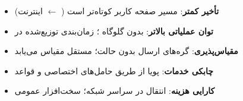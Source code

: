
\begin{itemize}
\tightlist
\item
  \textbf{تأخیر کمتر}: مسیر صفحه کاربر کوتاه‌تر است ( \ensuremath{\leftarrow} اینترنت)
\item
  \textbf{توان عملیاتی بالاتر}: بدون گلوگاه ؛ زمان‌بندی توزیع‌شده در 
\item
  \textbf{مقیاس‌پذیری}: گره‌های ارسال بدون حالت؛  مستقل مقیاس می‌یابد
\item
  \textbf{چابکی خدمات}:  پویا از طریق حامل‌های اختصاصی و قواعد 
\item
  \textbf{کارایی هزینه}: انتقال  در سراسر شبکه؛ سخت‌افزار عمومی
\end{itemize}




\CNchained{}




